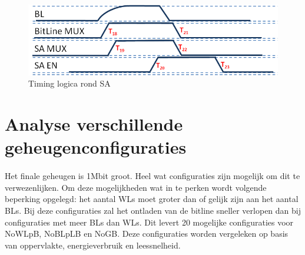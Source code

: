 \begin{figure}[!ht]
  \centering
  \includegraphics[scale=0.9]{../fig/hfdstk-timing-sa2.png}
  \caption[SA:timing]{Timing logica rond SA}
  \label{fig:sa_timing2}
\end{figure}

\section{Analyse verschillende geheugenconfiguraties}
\paragraph{}
Het finale geheugen is 1Mbit groot. Heel wat configuraties zijn mogelijk om dit te verwezenlijken. Om deze mogelijkheden wat in te perken wordt volgende beperking opgelegd: het aantal WLs moet groter dan of gelijk zijn aan het aantal BLs. Bij deze configuraties zal het ontladen van de bitline sneller verlopen dan bij configuraties met meer BLs dan WLs. Dit levert 20 mogelijke configuraties voor NoWLpB, NoBLpLB en NoGB. Deze configuraties worden vergeleken op basis van oppervlakte, energieverbruik en leessnelheid. 

